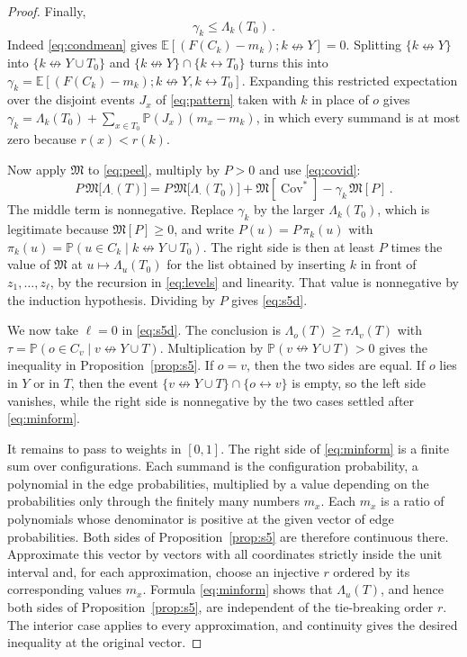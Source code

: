 \documentclass[11pt]{article}
\theoremstyle{definition}
\theoremstyle{remark}
\newcommand{\PP}{\mathbb P}
\newcommand{\EE}{\mathbb E}
\newcommand{\con}{\leftrightarrow}
\newcommand{\ncon}{\nleftrightarrow}
\DeclareMathOperator{\Cov}{Cov}
\newcommand{\Marg}{\mathfrak M}
\begin{document}
\begin{proof}
Finally,
\begin{equation}\label{eq:kappa}
 \gamma_k\leq \Lambda_k(T_0)\,.
\end{equation}
Indeed \eqref{eq:condmean} gives $\EE[(F(C_k)-m_k);k\ncon Y]=0$. Splitting $\{k\ncon Y\}$
into $\{k\ncon Y\cup T_0\}$ and $\{k\ncon Y\}\cap\{k\con T_0\}$ turns this into
$\gamma_k=\EE[(F(C_k)-m_k);k\ncon Y,k\con T_0]$. Expanding this restricted expectation over the disjoint
events $J_x$ of \eqref{eq:pattern} taken with $k$ in place of $o$ gives
$\gamma_k=\Lambda_k(T_0)+\sum_{x\in T_0}\PP(J_x)(m_x-m_k)$, in which every summand is at
most zero because $r(x)<r(k)$.

Now apply $\Marg$ to \eqref{eq:peel}, multiply by $P>0$ and use \eqref{eq:covid}:
\[
 P\,\Marg\bigl[\Lambda_\cdot(T)\bigr]=P\,\Marg\bigl[\Lambda_\cdot(T_0)\bigr]
 +\Marg[\Cov^{\ast}]-\gamma_k\,\Marg[P]\,.
\]
The middle term is nonnegative. Replace $\gamma_k$ by the larger $\Lambda_k(T_0)$, which is
legitimate because $\Marg[P]\ge0$, and write $P(u)=P\,\pi_k(u)$ with
$\pi_k(u)=\PP(u\in C_k\mid k\ncon Y\cup T_0)$. The right side is then at least $P$ times the
value of $\Marg$ at $u\mapsto\Lambda_u(T_0)$ for the list obtained by inserting $k$ in
front of $z_1,\dots,z_\ell$, by the recursion in \eqref{eq:levels} and linearity. That
value is nonnegative by the induction hypothesis. Dividing by $P$ gives \eqref{eq:s5d}.

We now take $\ell=0$ in \eqref{eq:s5d}. The conclusion is $\Lambda_o(T)\ge\tau\Lambda_v(T)$
with $\tau=\PP(o\in C_v\mid v\ncon Y\cup T)$. Multiplication by
$\PP(v\ncon Y\cup T)>0$ gives the inequality in Proposition~\ref{prop:s5}. If $o=v$, then
the two sides are equal. If $o$
lies in $Y$ or in $T$, then the event $\{v\ncon Y\cup T\}\cap\{o\con v\}$ is empty, so the
left side vanishes, while the right side is nonnegative by the two cases settled after
\eqref{eq:minform}.

It remains to pass to weights in $[0,1]$. The right side of \eqref{eq:minform} is a finite
sum over configurations. Each summand is the configuration probability, a polynomial in
the edge probabilities, multiplied by a value depending on the probabilities only through
the finitely many numbers $m_x$. Each $m_x$ is a ratio of polynomials whose denominator is
positive at the given vector of edge probabilities. Both sides of
Proposition~\ref{prop:s5} are therefore continuous there. Approximate this vector by
vectors with all coordinates strictly inside the unit interval and, for each approximation,
choose an injective $r$ ordered by its corresponding values $m_x$. Formula
\eqref{eq:minform} shows that $\Lambda_u(T)$, and hence both sides of
Proposition~\ref{prop:s5}, are independent of the tie-breaking order $r$. The interior
case applies to every approximation, and continuity gives the desired inequality at the
original vector.
\end{proof}
\end{document}
